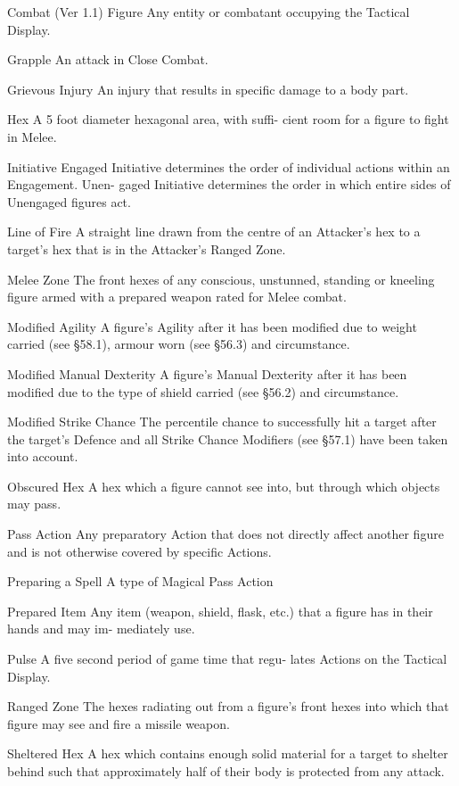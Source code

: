\begin{Chapter}{Combat (Ver 1.1)}
Figure  Any  entity  or  combatant  occupying  the 
Tactical Display. 

Grapple An attack in Close Combat. 

Grievous  Injury  An  injury  that  results  in  specific 
damage to a body part. 

Hex A 5 foot diameter hexagonal area, with suffi-
cient room for a figure to fight in Melee. 

Initiative  Engaged  Initiative  determines  the  order 
of individual actions within an Engagement. Unen-
gaged  Initiative  determines  the  order  in  which 
entire sides of Unengaged figures act. 

Line of Fire A straight line drawn from the centre 
of an Attacker’s hex to a target’s hex that is in the 
Attacker’s Ranged Zone. 

Melee  Zone  The  front  hexes  of  any  conscious, 
unstunned, standing or kneeling figure armed with 
a prepared weapon rated for Melee combat. 

Modified  Agility  A  figure’s  Agility  after  it  has 
been  modified  due  to  weight  carried  (see  §58.1), 
armour worn (see §56.3) and circumstance. 

Modified  Manual  Dexterity  A  figure’s  Manual 
Dexterity after it has been modified due to the type 
of shield carried (see §56.2) and circumstance. 

Modified Strike Chance The percentile chance to 
successfully  hit  a  target  after  the  target’s  Defence 
and  all  Strike  Chance  Modifiers  (see  §57.1)  have 
been taken into account. 

Obscured  Hex  A  hex  which  a  figure  cannot  see 
into, but through which objects may pass. 

Pass Action Any preparatory  Action that does not 
directly  affect  another  figure  and  is  not  otherwise 
covered by specific Actions. 

Preparing a Spell A type of Magical Pass Action 

Prepared  Item  Any  item  (weapon,  shield,  flask, 
etc.)  that  a  figure  has  in  their  hands  and  may  im-
mediately use. 

Pulse A five second period of game time that regu-
lates Actions on the Tactical Display. 

Ranged  Zone  The  hexes  radiating  out  from  a 
figure’s front hexes into which that figure may see 
and fire a missile weapon. 

Sheltered Hex A hex which contains enough solid 
material  for  a  target  to  shelter  behind  such  that 
approximately half  of their body is protected from 
any attack. 


\end{Chapter}
